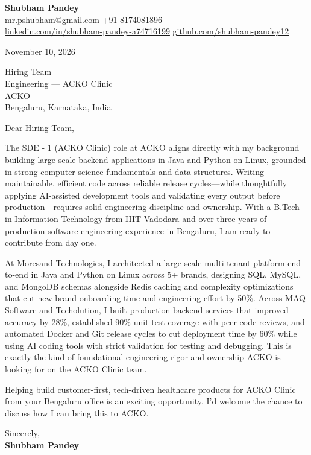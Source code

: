 \documentclass[a4paper,11pt]{article}
\begin{document}
\textbf{\Large Shubham Pandey}\\
\href{mailto:mr.pshubham@gmail.com}{mr.pshubham@gmail.com} \quad +91-8174081896\\
\href{https://www.linkedin.com/in/shubham-pandey-a74716199/}{linkedin.com/in/shubham-pandey-a74716199} \quad
\href{https://github.com/shubham-pandey12}{github.com/shubham-pandey12}

\vspace{1em}
November 10, 2026

\vspace{1em}
Hiring Team\\
Engineering --- ACKO Clinic\\
ACKO\\
Bengaluru, Karnataka, India

\vspace{1em}
Dear Hiring Team,

The SDE - 1 (ACKO Clinic) role at ACKO aligns directly with my background building large-scale backend applications in Java and Python on Linux, grounded in strong computer science fundamentals and data structures. Writing maintainable, efficient code across reliable release cycles---while thoughtfully applying AI-assisted development tools and validating every output before production---requires solid engineering discipline and ownership. With a B.Tech in Information Technology from IIIT Vadodara and over three years of production software engineering experience in Bengaluru, I am ready to contribute from day one.

At Moresand Technologies, I architected a large-scale multi-tenant platform end-to-end in Java and Python on Linux across 5+ brands, designing SQL, MySQL, and MongoDB schemas alongside Redis caching and complexity optimizations that cut new-brand onboarding time and engineering effort by 50\%. Across MAQ Software and Techolution, I built production backend services that improved accuracy by 28\%, established 90\% unit test coverage with peer code reviews, and automated Docker and Git release cycles to cut deployment time by 60\% while using AI coding tools with strict validation for testing and debugging. This is exactly the kind of foundational engineering rigor and ownership ACKO is looking for on the ACKO Clinic team.

Helping build customer-first, tech-driven healthcare products for ACKO Clinic from your Bengaluru office is an exciting opportunity. I'd welcome the chance to discuss how I can bring this to ACKO.

\vspace{1em}
Sincerely,\\[0.5em]
\textbf{Shubham Pandey}
\end{document}
